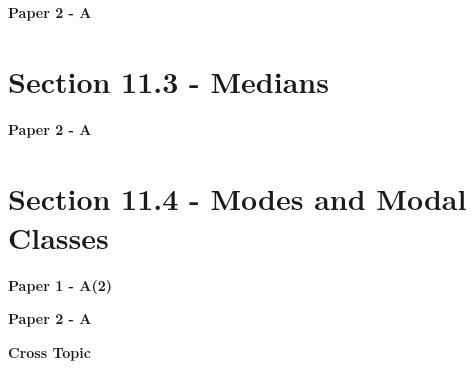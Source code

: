 \documentclass[12pt, a4paper]{article}
\begin{document}
\textbf{Paper 2 - A}
\begin{enumx}[label=\arabic*.,start=1]
\item {}\label{DSE2014-CoreP2-Q28} 
\item {}\label{DSE2018-CoreP2-Q29} 
\item {}\label{DSE2021-CoreP2-Q30} 
\item {}\label{DSE2023-CoreP2-Q30} 
\end{enumx}




\section*{Section 11.3 - Medians}\label{section:3-11-3}

\textbf{Paper 2 - A}
\begin{enumx}[label=\arabic*.,start=5]
\item {}\label{DSE2012S-CoreP2-Q28} 
\item {}\label{DSE2012-CoreP2-Q30} 
\end{enumx}




\section*{Section 11.4 - Modes and Modal Classes}\label{section:3-11-4}

\textbf{Paper 1 - A(2)}
\begin{enumx}[label=\arabic*.,start=7]
\item {}\label{DSE2018-CoreP1-Q11} 
\end{enumx}
\textbf{Paper 2 - A}
\begin{enumx}[label=\arabic*.,start=8]
\item {}\label{DSE2013-CoreP2-Q27} 
\item {}\label{DSE2015-CoreP2-Q30} 
\item {}\label{DSE2016-CoreP2-Q30} 
\end{enumx}
\textbf{Cross Topic}
\begin{enumx}[label=\arabic*.,start=11]
\item {}\label{DSE2019-CoreP1-Q08} 
\end{enumx}
\end{document}
